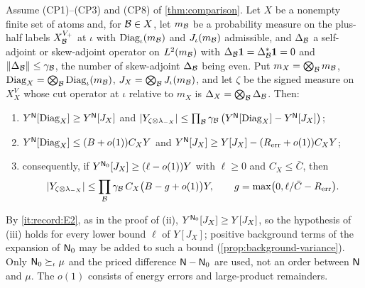 \begin{lemma}
\label{lem:record:variance-interface}
Assume (CP1)--(CP3) and (CP8) of \cref{thm:comparison}. Let $X$ be a nonempty
finite set of atoms and, for $\mathcal B\in X$, let $m_\mathcal B$ be a probability measure
on the plus-half labels $X_\mathcal B^{V_+}$ at $\iota$ with
$\operatorname{Diag}_\iota(m_\mathcal B)$ and $J_\iota(m_\mathcal B)$ admissible, and
$\Delta_\mathcal B$ a self-adjoint or skew-adjoint operator on $L^2(m_\mathcal B)$ with
$\Delta_\mathcal B\mathbf 1=\Delta_\mathcal B^*\mathbf 1=0$ and $\|\Delta_\mathcal B\|\le\gamma_\mathcal B$, the number
of skew-adjoint $\Delta_\mathcal B$ being even. Put $m_X=\bigotimes_\mathcal B m_\mathcal B$,
$\operatorname{Diag}_X=\bigotimes_\mathcal B\operatorname{Diag}_\iota(m_\mathcal B)$,
$J_X=\bigotimes_\mathcal B J_\iota(m_\mathcal B)$, and let $\zeta$ be the signed measure on
$X_X^V$ whose cut operator at $\iota$ relative to $m_X$ is
$\Delta_X=\bigotimes_\mathcal B\Delta_\mathcal B$. Then:
\begin{enumerate}[label=(\roman*)]
\item $Y^{\mathsf N}[\operatorname{Diag}_X]\ge Y^{\mathsf N}[J_X]$ and
 $|Y_{\zeta\otimes\lambda_{-X}}|\le\prod_\mathcal B\gamma_\mathcal B\,
 \bigl(Y^{\mathsf N}[\operatorname{Diag}_X]-Y^{\mathsf N}[J_X]\bigr)$;
\item $Y^{\mathsf N}[\operatorname{Diag}_X]\le(B+o(1))C_XY$ and
 $Y^{\mathsf N}[J_X]\ge Y[J_X]-(R_{\rm err}+o(1))C_XY$;
\item consequently, if $Y^{\mathsf N_0}[J_X]\ge(\ell-o(1))Y$ with $\ell\ge0$ and
 $C_X\le\bar C$, then
 \[
  |Y_{\zeta\otimes\lambda_{-X}}|\le\prod_\mathcal B\gamma_\mathcal B\,C_X\bigl(B-g+o(1)\bigr)Y,
  \qquad g=\max\bigl(0,\ell/\bar C-R_{\rm err}\bigr).
 \]
\end{enumerate}
By \ref{it:record:E2}, as in the proof of (ii), $Y^{\mathsf N_0}[J_X]\ge Y[J_X]$, so
the hypothesis of (iii) holds for every lower bound $\ell$ of $Y[J_X]$; positive
background terms of the expansion of $\mathsf N_0$ may be added to such a bound
(\cref{prop:background-variance}). Only $\mathsf N_0\succeq_\iota\mu$ and the priced
difference $\mathsf N-\mathsf N_0$ are used, not an order between $\mathsf N$ and $\mu$. The
$o(1)$ consists of energy errors and large-product remainders.
\end{lemma}

